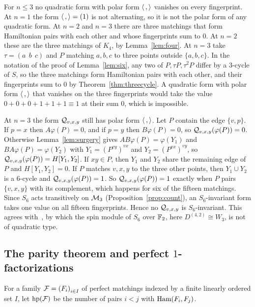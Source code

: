 \begin{remark}\label{rem:n3}
For $n\le3$ no quadratic form with polar form $\langle\,,\rangle$ vanishes on every fingerprint. At $n=1$ the form $\langle\,,\rangle=(1)$ is not alternating, so it is not the polar form of any quadratic form. At $n=2$ and $n=3$ there are three matchings that form Hamiltonian pairs with each other and whose fingerprints sum to $0$. At $n=2$ these are the three matchings of $K_4$, by Lemma~\ref{lem:four}. At $n=3$ take $\tau=(a\;\,b\;\,c)$ and $P$ matching $a,b,c$ to three points outside $\{a,b,c\}$. In the notation of the proof of Lemma~\ref{lem:six}, any two of $P,\tau P,\tau^{2}P$ differ by a $3$-cycle of $S$, so the three matchings form Hamiltonian pairs with each other, and their fingerprints sum to $0$ by Theorem~\ref{thm:threecycle}. A quadratic form with polar form $\langle\,,\rangle$ that vanishes on the three fingerprints would take the value $0+0+0+1+1+1\equiv1$ at their sum $0$, which is impossible.

At $n=3$ the form $\mathcal{Q}_{v,x,y}$ still has polar form $\langle\,,\rangle$. Let $P$ contain the edge $\{v,p\}$. If $p=x$ then $A\varphi(P)=0$, and if $p=y$ then $B\varphi(P)=0$, so $\mathcal{Q}_{v,x,y}(\varphi(P))=0$. Otherwise Lemma~\ref{lem:surgery} gives $AB\varphi(P)=\varphi(Y_1)$ and $BA\varphi(P)=\varphi(Y_2)$ with $Y_1={(P^{vy})}^{vx}$ and $Y_2={(P^{vx})}^{vy}$, so $\mathcal{Q}_{v,x,y}(\varphi(P))=H[Y_1,Y_2]$. If $xy\in P$, then $Y_1$ and $Y_2$ share the remaining edge of $P$ and $H[Y_1,Y_2]=0$. If $P$ matches $v,x,y$ to the three other points, then $Y_1\cup Y_2$ is a $6$-cycle and $\mathcal{Q}_{v,x,y}(\varphi(P))=1$. So $\mathcal{Q}_{v,x,y}(\varphi(P))=1$ exactly when $P$ pairs $\{v,x,y\}$ with its complement, which happens for six of the fifteen matchings. Since $S_6$ acts transitively on $\mathcal{M}_3$ (Proposition~\ref{prop:count}), an $S_6$-invariant form takes one value on all fifteen fingerprints. Hence no $\mathcal{Q}_{v,x,y}$ is $S_6$-invariant. This agrees with~\cite[Lemma~2]{Gow16}, by which the spin module of $S_6$ over $\mathbb{F}_2$, here $D^{(4,2)}\cong W_3$, is not of quadratic type.
\end{remark}

\subsection{The parity theorem and perfect \texorpdfstring{$1$}{1}-factorizations}\label{subsec:parity}

For a family $\mathcal{F}={(F_i)}_{i\in I}$ of perfect matchings indexed by a finite linearly ordered set $I$, let $\operatorname{hp}(\mathcal{F})$ be the number of pairs $i<j$ with $\operatorname{Ham}(F_i,F_j)$.

